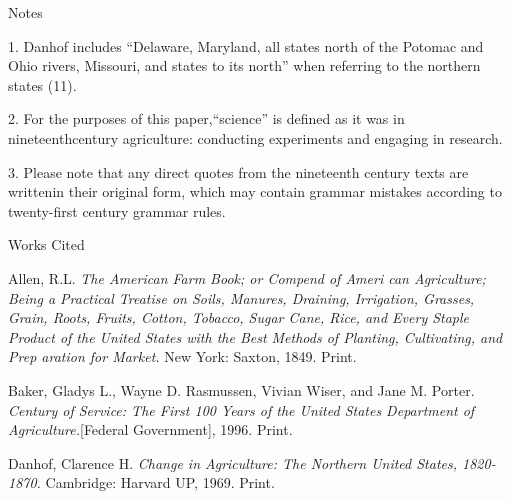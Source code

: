 \documentclass[12pt]{article}
\newcommand{\bibent}{\noindent \hangindent 40pt}
\newenvironment{workscited}{\newpage \begin{center} Works Cited \end{center}}{\newpage }
\begin{document}
\begin{flushleft}
\begin{center}
Notes
\end{center}


\setlength{\parindent}{0.5in}

1. Danhof includes “Delaware, Maryland, all states north of the Potomac and Ohio rivers, Missouri, and states to its north” when referring to the northern states (11).


2. For the purposes of this paper,“science” is defined as it was in nineteenthcentury agriculture: conducting experiments and engaging in research.


3. Please note that any direct quotes from the nineteenth century texts are writtenin their original form, which may contain grammar mistakes according to twenty-first century grammar rules.

\begin{workscited}

\bibent
Allen, R.L. \textit{The American Farm Book; or Compend of Ameri can Agriculture; Being a Practical Treatise on Soils, Manures, Draining, Irrigation, Grasses, Grain, Roots, Fruits, Cotton, Tobacco, Sugar Cane, Rice, and Every Staple Product of the United States with the Best Methods of Planting, Cultivating, and Prep aration for Market.} New York: Saxton, 1849. Print.

\bibent
Baker, Gladys L., Wayne D. Rasmussen, Vivian Wiser, and Jane M. Porter. \textit{Century of Service: The First 100 Years of the United States Department of Agriculture.}[Federal Government], 1996. Print.

\bibent
Danhof, Clarence H. \textit{Change in Agriculture: The Northern United States, 1820-1870.} Cambridge: Harvard UP, 1969. Print.


\end{workscited}

\end{flushleft}
\end{document}
